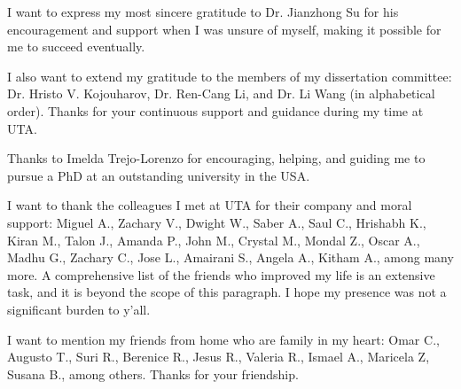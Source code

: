 

I want to express my most sincere gratitude to Dr. Jianzhong Su for his encouragement and support when I was unsure of myself, making it possible for me to succeed eventually.

I also want to extend my gratitude to the members of my dissertation committee: Dr. Hristo V. Kojouharov, Dr. Ren-Cang Li, and Dr. Li Wang (in alphabetical order).
%
Thanks for your continuous support and guidance during my time at UTA.

Thanks to Imelda Trejo-Lorenzo for encouraging, helping, and guiding me to pursue a PhD at an outstanding university in the USA.

I want to thank the colleagues I met at UTA for their company and moral support: Miguel A., Zachary V., Dwight W., Saber A., Saul C., Hrishabh K., Kiran M., Talon J., Amanda P., John M., Crystal M., Mondal Z., Oscar A., Madhu G., Zachary C., Jose L., Amairani S., Angela A., Kitham A., among many more.
%
A comprehensive list of the friends who improved my life is an extensive task, and it is beyond the scope of this paragraph.
%
I hope my presence was not a significant burden to y'all.

I want to mention my friends from home who are family in my heart: Omar C., Augusto T., Suri R., Berenice R., Jesus R., Valeria R., Ismael A., 
Maricela Z, Susana B., among others.
%
Thanks for your friendship.

%
%
